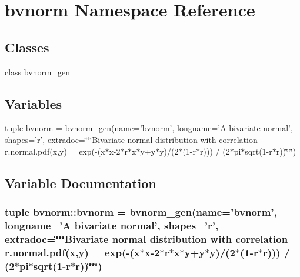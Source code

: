 \hypertarget{namespacebvnorm}{
\section{bvnorm Namespace Reference}
\label{namespacebvnorm}
}
\subsection*{Classes}
\begin{CompactItemize}
\item 
class \hyperlink{classbvnorm_1_1bvnorm__gen}{bvnorm\_\-gen}
\end{CompactItemize}
\subsection*{Variables}
\begin{CompactItemize}
\item 
tuple \hyperlink{namespacebvnorm_ffd1e4833c9d3af70673f92d0e9bb471}{bvnorm} = \hyperlink{classbvnorm_1_1bvnorm__gen}{bvnorm\_\-gen}(name='\hyperlink{namespacebvnorm_ffd1e4833c9d3af70673f92d0e9bb471}{bvnorm}', longname='A bivariate normal', shapes='r', extradoc=\char`\"{}\char`\"{}\char`\"{}Bivariate normal distribution with correlation r.normal.pdf(x,y) = exp(-(x$\ast$x-2$\ast$r$\ast$x$\ast$y+y$\ast$y)/(2$\ast$(1-r$\ast$r))) / (2$\ast$pi$\ast$sqrt(1-r$\ast$r))\char`\"{}\char`\"{}\char`\"{})
\end{CompactItemize}


\subsection{Variable Documentation}
\hypertarget{namespacebvnorm_ffd1e4833c9d3af70673f92d0e9bb471}{
\subsubsection[{bvnorm}]{\setlength{\rightskip}{0pt plus 5cm}tuple {\bf bvnorm::bvnorm} = {\bf bvnorm\_\-gen}(name='{\bf bvnorm}', longname='A bivariate normal', shapes='r', extradoc=\char`\"{}\char`\"{}\char`\"{}Bivariate normal distribution with correlation r.normal.pdf(x,y) = exp(-(x$\ast$x-2$\ast$r$\ast$x$\ast$y+y$\ast$y)/(2$\ast$(1-r$\ast$r))) / (2$\ast$pi$\ast$sqrt(1-r$\ast$r))\char`\"{}\char`\"{}\char`\"{})}}
\label{namespacebvnorm_ffd1e4833c9d3af70673f92d0e9bb471}


